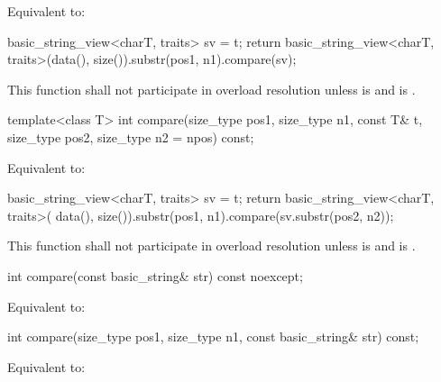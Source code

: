 \begin{itemdescr}
\pnum
\effects
Equivalent to:
\begin{codeblock}
{
  basic_string_view<charT, traits> sv = t;
  return basic_string_view<charT, traits>(data(), size()).substr(pos1, n1).compare(sv);
}
\end{codeblock}

\pnum
\remarks
This function shall not participate in overload resolution unless
 is  and
 is .
\end{itemdescr}

%
\begin{itemdecl}
template<class T>
  int compare(size_type pos1, size_type n1, const T& t, size_type pos2, size_type n2 = npos) const;
\end{itemdecl}

\begin{itemdescr}
\pnum
\effects
Equivalent to:
\begin{codeblock}
basic_string_view<charT, traits> sv = t;
return basic_string_view<charT, traits>(
    data(), size()).substr(pos1, n1).compare(sv.substr(pos2, n2));
\end{codeblock}

\pnum
\remarks
This function shall not participate in overload resolution
unless 
is  and  is .
\end{itemdescr}

%
\begin{itemdecl}
int compare(const basic_string& str) const noexcept;
\end{itemdecl}

\begin{itemdescr}
\pnum
\effects
Equivalent to:
\end{itemdescr}

%
\begin{itemdecl}
int compare(size_type pos1, size_type n1, const basic_string& str) const;
\end{itemdecl}

\begin{itemdescr}
\pnum
\effects
Equivalent to:
\end{itemdescr}

